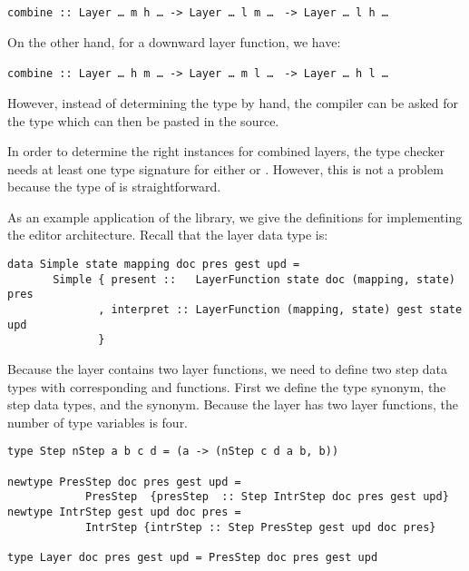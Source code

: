 \begin{small}
{\tt  combine :: Layer \dots~m h \dots}\verb| -> |{\tt Layer \dots~l m \dots} \verb| -> |{\tt Layer \dots~l h \dots}
\end{small}

On the other hand, for a downward layer function, we have:

\begin{small}
{\tt  combine :: Layer \dots~h m \dots}\verb| -> |{\tt Layer \dots~m l \dots} \verb| -> |{\tt Layer \dots~h l \dots}
\end{small}

However, instead of determining the type by hand, the compiler can be asked for the type which can then be pasted in the source.

In order to determine the right  instances for combined layers, the type checker needs at least one type signature for either  or . However, this is not a problem because the type of  is straightforward.


As an example application of the library, we give the definitions  for implementing the  editor architecture. Recall that the layer data type is:

\begin{small} %
\begin{verbatim}
data Simple state mapping doc pres gest upd =
       Simple { present ::   LayerFunction state doc (mapping, state) pres
              , interpret :: LayerFunction (mapping, state) gest state upd
              }
\end{verbatim}
\end{small}

Because the layer contains two layer functions, we need to define two step data types with corresponding  and  functions. First we define the  type synonym, the step data types, and the  synonym. Because the layer has two layer functions, the number of type variables is four.

\begin{small} %
\begin{verbatim}
type Step nStep a b c d = (a -> (nStep c d a b, b))

newtype PresStep doc pres gest upd = 
            PresStep  {presStep  :: Step IntrStep doc pres gest upd}
newtype IntrStep gest upd doc pres = 
            IntrStep {intrStep :: Step PresStep gest upd doc pres}

type Layer doc pres gest upd = PresStep doc pres gest upd
\end{verbatim}
\end{small}

